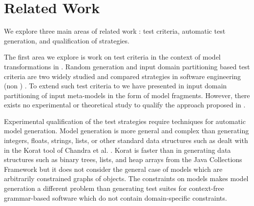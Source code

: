 \section{Related Work}
\label{sec:RelatedWork}


We explore three main areas of related work : test criteria, automatic test generation, and qualification of strategies. 

The first area we explore is work on test criteria in the context of model transformations in {\MDE}. Random generation and input domain partitioning based test criteria are two widely studied and compared  strategies in software engineering (non {\MDE})  \cite{vagoun1996}  \cite{elaine1991} \cite{Gutjahr99partitiontesting}. To extend such test criteria to {\MDE} we have presented in \cite{franck2007} input domain partitioning of input meta-models in the form of model fragments. However, there exists no experimental or theoretical study to qualify the approach proposed in \cite{franck2007}.

Experimental qualification of the test strategies require techniques for automatic model generation. Model generation is more general and complex than generating integers, floats, strings, lists, or other standard data structures such as dealt with in the Korat tool of Chandra et al. \cite{chandra2002}. Korat is faster than {\Alloy} in generating data structures such as binary trees, lists, and heap arrays from the Java Collections Framework but it does not consider the general case of models which are arbitrarily constrained graphs of objects. The constraints on models makes model generation a different problem than generating test suites for context-free grammar-based software \cite{hen2005} which do not contain domain-specific constraints. 

